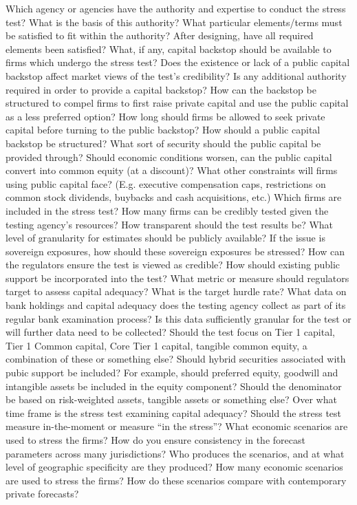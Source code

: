 \documentclass[12pt]{article}
\begin{document}
\begin{outline}[enumerate]

\1 Which agency or agencies have the authority and expertise to conduct the stress test?
\2 What is the basis of this authority?
\2 What particular elements/terms must be satisfied to fit within the authority?
\2 After designing, have all required elements been satisfied?
\1 What, if any, capital backstop should be available to firms which undergo the stress test?
\2 Does the existence or lack of a public capital backstop affect market views of the test's credibility?
\2 Is any additional authority required in order to provide a capital backstop?
\2 How can the backstop be structured to compel firms to first raise private capital and use the public capital as a less preferred option?
\2 How long should firms be allowed to seek private capital before turning to the public backstop?
\1 How should a public capital backstop be structured?
\2 What sort of security should the public capital be provided through?
\2 Should economic conditions worsen, can the public capital convert into common equity (at a discount)?
\2 What other constraints will firms using public capital face? (E.g. executive compensation caps, restrictions on common stock dividends, buybacks and cash acquisitions, etc.)
\1 Which firms are included in the stress test?
\2 How many firms can be credibly tested given the testing agency's resources?
\1 How transparent should the test results be? What level of granularity for estimates should be publicly available?
\2 If the issue is sovereign exposures, how should these sovereign exposures be stressed?
\1 How can the regulators ensure the test is viewed as credible?
\2 How should existing public support be incorporated into the test?
\2 What metric or measure should regulators target to assess capital adequacy?
\3 What is the target hurdle rate?
\3 What data on bank holdings and capital adequacy does the testing agency collect as part of its regular bank examination process? Is this data sufficiently granular for the test or will further data need to be collected?
\3 Should the test focus on Tier 1 capital, Tier 1 Common capital, Core Tier 1 capital, tangible common equity, a combination of these or something else?
\4 Should hybrid securities associated with pubic support be included?
\4 For example, should preferred equity, goodwill and intangible assets be included in the equity component?
\4 Should the denominator be based on risk-weighted assets, tangible assets or something else?
\1 Over what time frame is the stress test examining capital adequacy?
\2 Should the stress test measure in-the-moment or measure ``in the stress''?
\1 What economic scenarios are used to stress the firms?
\2 How do you ensure consistency in the forecast parameters across many jurisdictions?
\2 Who produces the scenarios, and at what level of geographic specificity are they produced?
\2 How many economic scenarios are used to stress the firms?
\2 How do these scenarios compare with contemporary private forecasts?

\end{outline}
\end{document}
